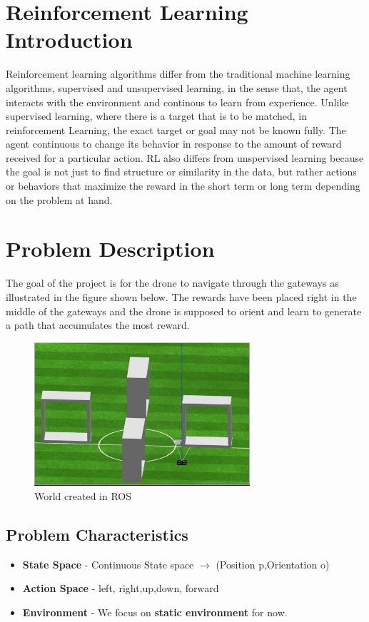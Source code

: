 \documentclass[12pt]{article}
\begin{document}
\section{Reinforcement Learning Introduction}
Reinforcement learning algorithms differ from the traditional machine learning algorithms, supervised and unsupervised learning, in the sense 
that, the agent interacts with the environment and continous  to learn from experience. Unlike supervised learning, where there is a target 
that is to be matched, in reinforcement Learning, the exact target or goal may not be known fully. 
The agent continuous to change its behavior in response
to the amount of reward received for a particular action. RL also differs from unspervised learning because the goal is not just to  find 
structure or similarity in the data, but rather actions or behaviors that maximize the reward in the short term or long term depending on the
problem at hand.
 
\section{Problem Description}
The goal of the project is for the drone to navigate through the gateways as illustrated in the figure shown below. The rewards have been placed
right in the middle of the gateways and the drone is supposed to orient and learn to generate a path that accumulates the most reward.


\begin{figure}[h]
    \centering
    \includegraphics[width=8cm]{gazebo}
    \caption{World created in ROS}
    \label{fig:3D environment created in matplotlib}
\end{figure}

\subsection{Problem Characteristics}
\begin{itemize} 
  \item \textbf{State Space} -  Continuous State space $\rightarrow$ (Position p,Orientation o) 
  \item \textbf{Action Space} - left, right,up,down, forward 
  \item \textbf{Environment} - We focus on \textbf{static environment} for now.
\end{itemize}
\end{document}
